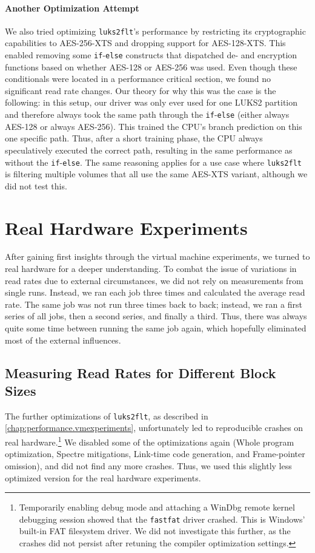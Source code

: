 \paragraph{Another Optimization Attempt}
We also tried optimizing \texttt{luks2flt}'s performance by restricting its cryptographic capabilities to AES-256-XTS and dropping support for AES-128-XTS. This enabled removing some \texttt{if}-\texttt{else} constructs that dispatched de- and encryption functions based on whether AES-128 or AES-256 was used. Even though these conditionals were located in a performance critical section, we found no significant read rate changes. Our theory for why this was the case is the following: in this setup, our driver was only ever used for one LUKS2 partition and therefore always took the same path through the \texttt{if}-\texttt{else} (either always AES-128 or always AES-256). This trained the CPU's branch prediction on this one specific path. Thus, after a short training phase, the CPU always speculatively executed the correct path, resulting in the same performance as without the \texttt{if}-\texttt{else}. The same reasoning applies for a use case where \texttt{luks2flt} is filtering multiple volumes that all use the same AES-XTS variant, although we did not test this.

\section{Real Hardware Experiments}
\label{chap:performance.hwexperiments}
After gaining first insights through the virtual machine experiments, we turned to real hardware for a deeper understanding. To combat the issue of variations in read rates due to external circumstances, we did not rely on measurements from single runs. Instead, we ran each job three times and calculated the average read rate. The same job was not run three times back to back; instead, we ran a first series of all jobs, then a second series, and finally a third. Thus, there was always quite some time between running the same job again, which hopefully eliminated most of the external influences.

\subsection{Measuring Read Rates for Different Block Sizes}
\label{chap:performance.hwexperiments.readrateoverblocksize}
The further optimizations of \texttt{luks2flt}, as described in \autoref{chap:performance.vmexperiments}, unfortunately led to reproducible crashes on real hardware.\footnote{\label{fn:performance.hwexperiments.fastfatcrash} Temporarily enabling debug mode and attaching a WinDbg remote kernel debugging session showed that the \texttt{fastfat} driver crashed. This is Windows' built-in FAT filesystem driver. We did not investigate this further, as the crashes did not persist after retuning the compiler optimization settings.} We disabled some of the optimizations again (Whole program optimization, Spectre mitigations, Link-time code generation, and Frame-pointer omission), and did not find any more crashes. Thus, we used this slightly less optimized version for the real hardware experiments.

